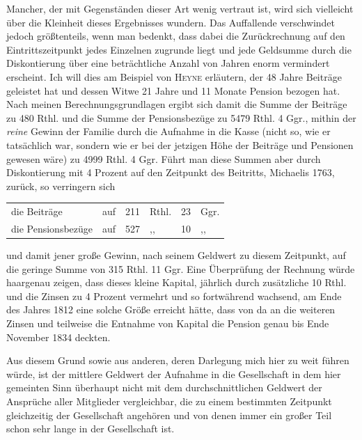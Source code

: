 Mancher, der mit Gegenständen dieser Art wenig vertraut ist, wird sich vielleicht über die Kleinheit dieses Ergebnisses wundern. Das Auffallende verschwindet jedoch größtenteils, wenn man bedenkt, dass dabei die Zurückrechnung auf den Eintrittszeitpunkt jedes Einzelnen zugrunde liegt und jede Geldsumme durch die Diskontierung über eine beträchtliche Anzahl von Jahren enorm vermindert erscheint. Ich will dies am Beispiel von \textsc{Heyne} erläutern, der 48 Jahre Beiträge geleistet hat und dessen Witwe 21 Jahre und 11 Monate Pension bezogen hat. Nach meinen Berechnungsgrundlagen ergibt sich damit die Summe der Beiträge zu 480 Rthl. und die Summe der Pensionsbezüge zu 5479 Rthl. 4 Ggr., mithin der
\textit{reine} Gewinn der Familie durch die Aufnahme in die Kasse (nicht so, wie er tatsächlich war, sondern wie er bei der jetzigen Höhe der Beiträge und Pensionen gewesen wäre) zu 4999 Rthl. 4 Ggr. Führt man diese Summen aber durch Diskontierung mit 4 Prozent auf den Zeitpunkt des Beitritts, Michaelis 1763, zurück, so verringern sich
\begin{center}
\begin{tabular}{l l r l r l}
die Beiträge&auf&211&Rthl.&23&Ggr.\\
die Pensionsbezüge&auf&527&,,&10&,,
\end{tabular}
\end{center}
\noindent und damit jener große Gewinn, nach seinem Geldwert zu diesem Zeitpunkt, auf die geringe Summe von 315 Rthl. 11 Ggr. Eine Überprüfung der Rechnung würde haargenau zeigen, dass dieses kleine Kapital, jährlich durch zusätzliche 10 Rthl. und die Zinsen zu 4 Prozent vermehrt und so fortwährend wachsend, am Ende des Jahres 1812 eine solche Größe erreicht hätte, dass von da an die weiteren Zinsen und teilweise die Entnahme von Kapital die Pension genau bis Ende November 1834 deckten.

Aus diesem Grund sowie aus anderen, deren Darlegung mich hier zu weit führen würde, ist der mittlere Geldwert der Aufnahme in die Gesellschaft in dem hier gemeinten Sinn überhaupt nicht mit dem durchschnittlichen Geldwert der Ansprüche aller Mitglieder vergleichbar, die zu einem bestimmten Zeitpunkt gleichzeitig der Gesellschaft angehören und von denen immer ein großer Teil schon sehr lange in der Gesellschaft ist.


